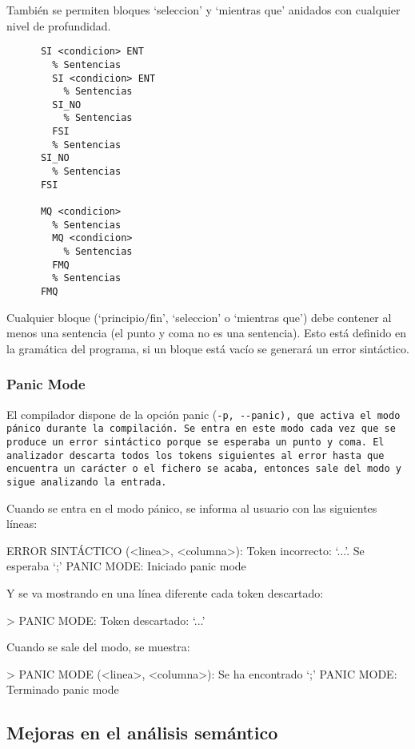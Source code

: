 También se permiten bloques `seleccion' y `mientras que' anidados con cualquier nivel de profundidad.

  \begin{verbatim}
      SI <condicion> ENT
        % Sentencias
        SI <condicion> ENT
          % Sentencias
        SI_NO
          % Sentencias
        FSI
        % Sentencias
      SI_NO
        % Sentencias
      FSI

      MQ <condicion>
        % Sentencias
        MQ <condicion>
          % Sentencias
        FMQ
        % Sentencias
      FMQ
  \end{verbatim}

  Cualquier bloque (`principio/fin', `seleccion' o `mientras que') debe contener al menos una sentencia (el punto y coma no es una sentencia). Esto está definido en la gramática del programa, si un bloque está vacío se generará un error sintáctico.


\subsubsection{Panic Mode}
El compilador dispone de la opción panic (\tt{-p}, \tt{-{}-panic}), que activa el modo pánico durante la compilación. Se entra en este modo cada vez que se produce un error sintáctico porque se esperaba un punto y coma. El analizador descarta todos los tokens siguientes al error hasta que encuentra un carácter \car{;} o el fichero se acaba, entonces sale del modo y sigue analizando la entrada.

Cuando se entra en el modo pánico, se informa al usuario con las siguientes líneas:

\begin{codigo}
ERROR SINTÁCTICO (<linea>, <columna>): Token incorrecto: `...'. Se esperaba `;'
PANIC MODE: Iniciado panic mode
\end{codigo}

Y se va mostrando en una línea diferente cada token descartado:

\begin{codigo}
> PANIC MODE: Token descartado: `...'
\end{codigo}

Cuando se sale del modo, se muestra:

\begin{codigo}
  > PANIC MODE (<linea>, <columna>): Se ha encontrado `;'
PANIC MODE: Terminado panic mode
\end{codigo}

\subsection{Mejoras en el análisis semántico}
